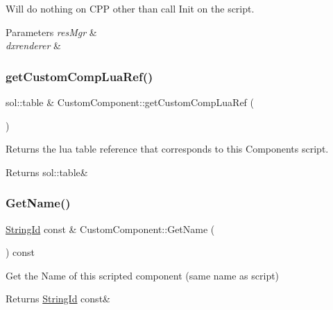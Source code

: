 Will do nothing on C\+PP other than call Init on the script. 


\begin{DoxyParams}{Parameters}
{\em res\+Mgr} & \\
\hline
{\em dxrenderer} & \\
\hline
\end{DoxyParams}
\mbox{\label{classCustomComponent_a5d59a3fcc75fbe18c2d2ab9d1fe76576}} 
\subsubsection{\texorpdfstring{get\+Custom\+Comp\+Lua\+Ref()}{getCustomCompLuaRef()}}
{\footnotesize\ttfamily sol\+::table \& Custom\+Component\+::get\+Custom\+Comp\+Lua\+Ref (\begin{DoxyParamCaption}{ }\end{DoxyParamCaption})}



Returns the lua table reference that corresponds to this Component\textquotesingle{}s script. 

\begin{DoxyReturn}{Returns}
sol\+::table\& 
\end{DoxyReturn}
\mbox{\label{classCustomComponent_aefb68297be52020412723f27a3c003f0}} 
\subsubsection{\texorpdfstring{Get\+Name()}{GetName()}}
{\footnotesize\ttfamily \hyperlink{classStringId}{String\+Id} const  \& Custom\+Component\+::\+Get\+Name (\begin{DoxyParamCaption}{ }\end{DoxyParamCaption}) const}



Get the Name of this scripted component (same name as script) 

\begin{DoxyReturn}{Returns}
\hyperlink{classStringId}{String\+Id} const\& 
\end{DoxyReturn}
\mbox{\label{classCustomComponent_a614f2af8f444be376d83cc00f6b9c7ea}} 
